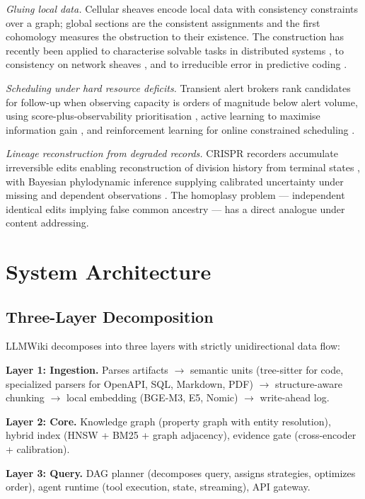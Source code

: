 \emph{Gluing local data.} Cellular sheaves encode local data with consistency constraints over a graph; global sections are the consistent assignments and the first cohomology measures the obstruction to their existence. The construction has recently been applied to characterise solvable tasks in distributed systems \citep{sheafdistributed2025}, to consistency on network sheaves \citep{sheafnetworks2025}, and to irreducible error in predictive coding \citep{sheafpc2025}.

\emph{Scheduling under hard resource deficits.} Transient alert brokers rank candidates for follow-up when observing capacity is orders of magnitude below alert volume, using score-plus-observability prioritisation \citep{aas2rto2025}, active learning to maximise information gain \citep{fink2025active}, and reinforcement learning for online constrained scheduling \citep{rlfollowup2025}.

\emph{Lineage reconstruction from degraded records.} CRISPR recorders accumulate irreversible edits enabling reconstruction of division history from terminal states \citep{lineagetracing2026}, with Bayesian phylodynamic inference supplying calibrated uncertainty under missing and dependent observations \citep{phylodynamic2025}. The homoplasy problem --- independent identical edits implying false common ancestry --- has a direct analogue under content addressing.

\section{System Architecture}
\label{sec:paper:arch}

\subsection{Three-Layer Decomposition}
LLMWiki decomposes into three layers with strictly unidirectional data flow:

\textbf{Layer 1: Ingestion.} Parses artifacts $\to$ semantic units (tree-sitter for code, specialized parsers for OpenAPI, SQL, Markdown, PDF) $\to$ structure-aware chunking $\to$ local embedding (BGE-M3, E5, Nomic) $\to$ write-ahead log.

\textbf{Layer 2: Core.} Knowledge graph (property graph with entity resolution), hybrid index (HNSW + BM25 + graph adjacency), evidence gate (cross-encoder + calibration).

\textbf{Layer 3: Query.} DAG planner (decomposes query, assigns strategies, optimizes order), agent runtime (tool execution, state, streaming), API gateway.

